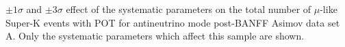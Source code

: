 \begin{table}	
	\begin{adjustbox}{width=\textwidth, totalheight=\textheight, keepaspectratio}
		
	\end{adjustbox}
	\caption
	{
		$\pm1\sigma$ and $\pm3\sigma$ effect of the systematic parameters on the total number of $\mu$-like Super-K events with \RunPeriod POT for antineutrino mode post-BANFF Asimov data set A. Only the systematic parameters which affect this sample are shown.
	}
\end{table}\clearpage